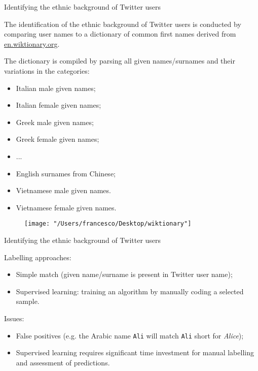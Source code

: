 \documentclass[serif, aspectratio=169]{beamer}
\begin{document}
\begin{frame}
{Identifying the ethnic background of Twitter users}

{\small

The identification of the ethnic background of Twitter users is conducted by comparing user names to a dictionary of common first names derived from \url{en.wiktionary.org}.

The dictionary is compiled by parsing all given names/surnames and their variations in the categories:

}

{\tiny

\begin{itemize}

\item Italian male given names;
\item Italian female given names;
\item Greek male given names;
\item Greek female given names;
\item ... 
\item English surnames from Chinese;
\item Vietnamese male given names‎.
\item Vietnamese female given names‎.

\end{itemize}

}

\end{frame}

\begin{frame}

\begin{figure}
\texttt{[image: "/Users/francesco/Desktop/wiktionary"]}
\end{figure}

\end{frame}

\begin{frame}
{Identifying the ethnic background of Twitter users}

Labelling approaches:

\begin{itemize}

\item Simple match (given name/surname is present in Twitter user name);
\item Supervised learning: training an algorithm by manually coding a selected sample.

\end{itemize}

Issues:

\begin{itemize}

\item False positives (e.g. the Arabic name \texttt{Ali} will match \texttt{Ali} short for \textit{Alice});
\item Supervised learning requires significant time investment for manual labelling and assessment of predictions. 

\end{itemize}

\end{frame}
\end{document}
